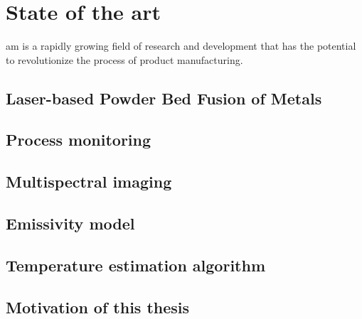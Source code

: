 \chapter{State of the art}%
\gls{am} is a rapidly growing field of research and development that has the potential 
to revolutionize the process of product manufacturing.
%
%
\section{Laser-based Powder Bed Fusion of Metals}


\section{Process monitoring}%

%
%
\section{Multispectral imaging}%

%
%
\section{Emissivity model}%

%
%
\section{Temperature estimation algorithm}


\section{Motivation of this thesis}